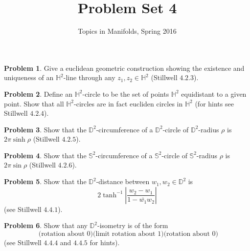\documentclass{amsart}
\newcommand{\+}[1]{\ensuremath{\mathbf{#1}}}
\theoremstyle{definition}
\newtheorem{prob}{Problem}
\begin{document}
\title{Problem Set 4}
\author{Topics in Manifolds, Spring 2016}

\maketitle


\begin{prob}
Give a euclidean geometric construction showing the existence and uniqueness of an $\mathbb{H}^2$-line
through any $z_1, z_2 \in \mathbb{H}^2$ (Stillwell $4.2.3$).
\end{prob}

\begin{prob}
Define an $\mathbb{H}^2$-circle to be the set of points $\mathbb{H}^2$ equidistant to a given point.  Show that
all $\mathbb{H}^2$-circles are in fact eucliden circles in $\mathbb{H}^2$ (for hints see Stillwell $4.2.4$).
\end{prob}

\begin{prob}
 Show that the $\mathbb{D}^2$-circumference of a $\mathbb{D}^2$-circle of $\mathbb{D}^2$-radius $\rho$ is
 $2\pi \sinh \rho$ (Stillwell $4.2.5$).
\end{prob}

\begin{prob}
  Show that the $\mathbb{S}^2$-circumference of a $\mathbb{S}^2$-circle of $\mathbb{S}^2$-radius $\rho$ is
 $2\pi \sin \rho$ (Stillwell $4.2.6$).
\end{prob}

\begin{prob}
 Show that the $\mathbb{D}^2$-distance between  $w_1,w_2 \in \mathbb{D}^2$ is
 \[
 2\tanh^{-1} \left| \frac{w_2 - w_1}{1 - \bar{w_1}w_2} \right|
 \]
 (see Stillwell $4.4.1$).
 \end{prob}
 
 \begin{prob}
  Show that any $\mathbb{D}^2$-isometry is of the form
  \[
 \text{ (rotation about $0$)(limit rotation about $1$)(rotation about $0$)}  
 \]
  (see Stillwell $4.4.4$ and $4.4.5$ for hints).
 \end{prob}
\end{document}
